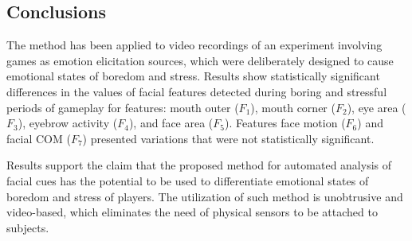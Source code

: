 \subsection{Conclusions}

The method has been applied to video recordings of an experiment involving games as emotion elicitation sources, which were deliberately designed to cause emotional states of boredom and stress. Results show statistically significant differences in the values of facial features detected during boring and stressful periods of gameplay for features: mouth outer ($F_1$), mouth corner ($F_2$), eye area ($F_3$), eyebrow activity ($F_4$), and face area ($F_5$). Features face motion ($F_6$) and facial COM ($F_7$) presented variations that were not statistically significant.

Results support the claim that the proposed method for automated analysis of facial cues has the potential to be used to differentiate emotional states of boredom and stress of players. The utilization of such method is unobtrusive and video-based, which eliminates the need of physical sensors to be attached to subjects.
